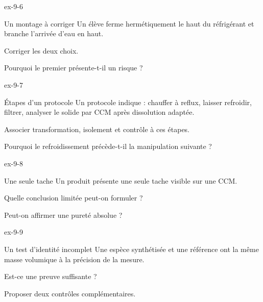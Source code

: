 \begin{blocLivre}{ex-9-6}\begin{exercice}[2]{Un montage à corriger}
Un élève ferme hermétiquement le haut du réfrigérant et branche l’arrivée d’eau en haut.
\begin{questions}
\item Corriger les deux choix.
\item Pourquoi le premier présente-t-il un risque ?
\end{questions}
\end{exercice}\end{blocLivre}
\begin{blocLivre}{ex-9-7}\begin{exercice}[2]{Étapes d’un protocole}
Un protocole indique : chauffer à reflux, laisser refroidir, filtrer, analyser le solide par CCM après dissolution adaptée.
\begin{questions}
\item Associer transformation, isolement et contrôle à ces étapes.
\item Pourquoi le refroidissement précède-t-il la manipulation suivante ?
\end{questions}
\end{exercice}\end{blocLivre}
\begin{blocLivre}{ex-9-8}\begin{exercice}[2]{Une seule tache}
Un produit présente une seule tache visible sur une CCM.
\begin{questions}
\item Quelle conclusion limitée peut-on formuler ?
\item Peut-on affirmer une pureté absolue ?
\end{questions}
\end{exercice}\end{blocLivre}
\begin{blocLivre}{ex-9-9}\begin{exercice}[3]{Un test d’identité incomplet}
Une espèce synthétisée et une référence ont la même masse volumique à la précision de la mesure.
\begin{questions}
\item Est-ce une preuve suffisante ?
\item Proposer deux contrôles complémentaires.
\end{questions}
\end{exercice}\end{blocLivre}
